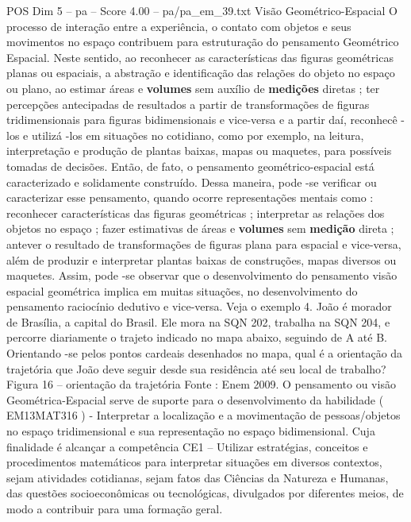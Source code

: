 \begin{textsample}{POS Dim 5 – pa – Score 4.00 – pa/pa\_em\_39.txt}  \label{ex:f5_pos_247}
Visão Geométrico-Espacial O processo de interação entre a experiência, o contato com objetos e seus movimentos no espaço contribuem para estruturação do pensamento Geométrico Espacial.
Neste sentido, ao reconhecer as características das figuras geométricas planas ou espaciais, a abstração e identificação das relações do objeto no espaço ou plano, ao estimar áreas e \textbf{volumes} sem auxílio de \textbf{medições} diretas ; ter percepções antecipadas de resultados a partir de transformações de figuras tridimensionais para figuras bidimensionais e vice-versa e a partir daí, reconhecê -los e utilizá -los em situações no cotidiano, como por exemplo, na leitura, interpretação e produção de plantas baixas, mapas ou maquetes, para possíveis tomadas de decisões.
Então, de fato, o pensamento geométrico-espacial está caracterizado e solidamente construído.
Dessa maneira, pode -se verificar ou caracterizar esse pensamento, quando ocorre representações mentais como : reconhecer características das figuras geométricas ; interpretar as relações dos objetos no espaço ; fazer estimativas de áreas e \textbf{volumes} sem \textbf{medição} direta ; antever o resultado de transformações de figuras plana para espacial e vice-versa, além de produzir e interpretar plantas baixas de construções, mapas diversos ou maquetes.
Assim, pode -se observar que o desenvolvimento do pensamento visão espacial geométrica implica em muitas situações, no desenvolvimento do pensamento raciocínio dedutivo e vice-versa.
Veja o exemplo 4.
João é morador de Brasília, a capital do Brasil.
Ele mora na SQN 202, trabalha na SQN 204, e percorre diariamente o trajeto indicado no mapa abaixo, seguindo de A até B.
Orientando -se pelos pontos cardeais desenhados no mapa, qual é a orientação da trajetória que João deve seguir desde sua residência até seu local de trabalho?
Figura 16 – orientação da trajetória Fonte : Enem 2009.
O pensamento ou visão Geométrica-Espacial serve de suporte para o desenvolvimento da habilidade ( EM13MAT316 ) - Interpretar a localização e a movimentação de pessoas/objetos no espaço tridimensional e sua representação no espaço bidimensional.
Cuja finalidade é alcançar a competência CE1 – Utilizar estratégias, conceitos e procedimentos matemáticos para interpretar situações em diversos contextos, sejam atividades cotidianas, sejam fatos das Ciências da Natureza e Humanas, das questões socioeconômicas ou tecnológicas, divulgados por diferentes meios, de modo a contribuir para uma formação geral.

\end{textsample}
